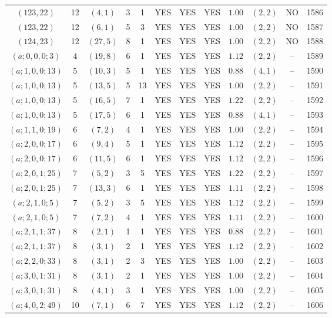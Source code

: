 \begin{longtable}{|c|c|c|c|c|c|c|c|c|c|c|c|}
$(123,22)$ & 12 & $(4,1)$ & 3 & 1 & YES & YES & YES & $1.00$ & $(2,2)$ & NO & 1586\\
$(123,22)$ & 12 & $(6,1)$ & 5 & 3 & YES & YES & YES & $1.00$ & $(2,2)$ & NO & 1587\\
$(124,23)$ & 12 & $(27,5)$ & 8 & 1 & YES & YES & YES & $1.00$ & $(2,2)$ & NO & 1588\\
$(a;0,0,0;3)$ & 4 & $(19,8)$ & 6 & 1 & YES & YES & YES & $1.12$ & $(2,2)$ & -- & 1589\\
$(a;1,0,0;13)$ & 5 & $(10,3)$ & 5 & 1 & YES & YES & YES & $0.88$ & $(4,1)$ & -- & 1590\\
$(a;1,0,0;13)$ & 5 & $(13,5)$ & 5 & 13 & YES & YES & YES & $1.00$ & $(2,2)$ & -- & 1591\\
$(a;1,0,0;13)$ & 5 & $(16,5)$ & 7 & 1 & YES & YES & YES & $1.22$ & $(2,2)$ & -- & 1592\\
$(a;1,0,0;13)$ & 5 & $(17,5)$ & 6 & 1 & YES & YES & YES & $0.88$ & $(4,1)$ & -- & 1593\\
$(a;1,1,0;19)$ & 6 & $(7,2)$ & 4 & 1 & YES & YES & YES & $1.00$ & $(2,2)$ & -- & 1594\\
$(a;2,0,0;17)$ & 6 & $(9,4)$ & 5 & 1 & YES & YES & YES & $1.12$ & $(2,2)$ & -- & 1595\\
$(a;2,0,0;17)$ & 6 & $(11,5)$ & 6 & 1 & YES & YES & YES & $1.12$ & $(2,2)$ & -- & 1596\\
$(a;2,0,1;25)$ & 7 & $(5,2)$ & 3 & 5 & YES & YES & YES & $1.22$ & $(2,2)$ & -- & 1597\\
$(a;2,0,1;25)$ & 7 & $(13,3)$ & 6 & 1 & YES & YES & YES & $1.11$ & $(2,2)$ & -- & 1598\\
$(a;2,1,0;5)$ & 7 & $(5,2)$ & 3 & 5 & YES & YES & YES & $1.12$ & $(2,2)$ & -- & 1599\\
$(a;2,1,0;5)$ & 7 & $(7,2)$ & 4 & 1 & YES & YES & YES & $1.11$ & $(2,2)$ & -- & 1600\\
$(a;2,1,1;37)$ & 8 & $(2,1)$ & 1 & 1 & YES & YES & YES & $0.88$ & $(2,2)$ & -- & 1601\\
$(a;2,1,1;37)$ & 8 & $(3,1)$ & 2 & 1 & YES & YES & YES & $1.12$ & $(2,2)$ & -- & 1602\\
$(a;2,2,0;33)$ & 8 & $(3,1)$ & 2 & 3 & YES & YES & YES & $1.00$ & $(2,2)$ & -- & 1603\\
$(a;3,0,1;31)$ & 8 & $(3,1)$ & 2 & 1 & YES & YES & YES & $1.00$ & $(2,2)$ & -- & 1604\\
$(a;3,0,1;31)$ & 8 & $(4,1)$ & 3 & 1 & YES & YES & YES & $1.00$ & $(2,2)$ & -- & 1605\\
$(a;4,0,2;49)$ & 10 & $(7,1)$ & 6 & 7 & YES & YES & YES & $1.12$ & $(2,2)$ & -- & 1606\\

\end{longtable}
